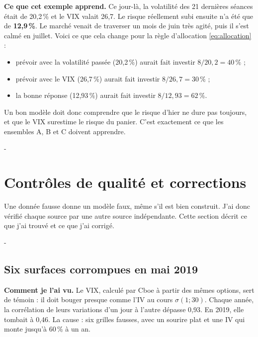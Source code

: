 \documentclass[10pt,a4paper]{article}
\makeatletter
\newcommand{\besoin}[1]{\par\penalty-100\begingroup\setlength{\dimen@}{#1}%
  \dimen@ii\pagegoal\advance\dimen@ii-\pagetotal
  \ifdim\dimen@>\dimen@ii\ifdim\dimen@ii>\z@\vfil\fi\break\fi\endgroup}
\let\sectionorigine\section
\renewcommand{\section}{\besoin{6\baselineskip}\sectionorigine}
\let\soussectionorigine\subsection
\renewcommand{\subsection}{\besoin{5\baselineskip}\soussectionorigine}
\makeatother
\begin{document}
\textbf{Ce que cet exemple apprend.} Ce jour-là, la volatilité des 21 dernières séances était de 20,2\,\% et le VIX valait 26,7. Le risque réellement subi ensuite n'a été que de \textbf{12,9\,\%}. Le marché venait de traverser un mois de juin très agité, puis il s'est calmé en juillet. Voici ce que cela change pour la règle d'allocation \eqref{eq:allocation} :
\begin{itemize}[nosep,leftmargin=*]
  \item prévoir avec la volatilité passée (20,2\,\%) aurait fait investir $8/20{,}2=40\,\%$ ;
  \item prévoir avec le VIX (26,7\,\%) aurait fait investir $8/26{,}7=30\,\%$ ;
  \item la bonne réponse (12,93\,\%) aurait fait investir $8/12{,}93=62\,\%$.
\end{itemize}
Un bon modèle doit donc comprendre que le risque d'hier ne dure pas toujours, et que le VIX surestime le risque du panier. C'est exactement ce que les ensembles A, B et C doivent apprendre.

\section{Contrôles de qualité et corrections}\label{sec:controles}
Une donnée fausse donne un modèle faux, même s'il est bien construit. J'ai donc vérifié chaque source par une autre source indépendante. Cette section décrit ce que j'ai trouvé et ce que j'ai corrigé.

\subsection{Six surfaces corrompues en mai 2019}
\textbf{Comment je l'ai vu.} Le VIX, calculé par Cboe à partir des mêmes options, sert de témoin : il doit bouger presque comme l'IV au cours $\sigma(1;30)$. Chaque année, la corrélation de leurs variations d'un jour à l'autre dépasse 0,93. En 2019, elle tombait à 0,46. La cause : six grilles fausses, avec un sourire plat et une IV qui monte jusqu'à 60\,\% à un an.
\end{document}
